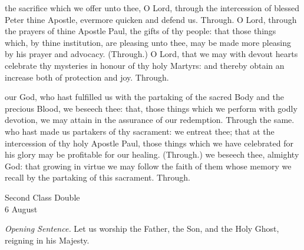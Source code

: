 \secret
{} the sacrifice which we offer unto thee, O Lord, through the intercession of blessed Peter thine Apostle, evermore quicken and defend us. Through.
 O Lord, through the prayers of thine Apostle Paul, the gifts of thy people: that those things which, by thine institution, are pleasing unto thee, may be made more pleasing by his prayer and advocacy. (Through.)
 O Lord, that we may with devout hearts celebrate thy mysteries in honour of thy holy Martyrs: and thereby obtain an increase both of protection and joy. Through.


\postcommunion
{} our God, who hast fulfilled us with the partaking of the sacred Body and the precious Blood, we beseech thee: that, those things which we perform with godly devotion, we may attain in the assurance of our redemption. Through the same.
 who hast made us partakers of thy sacrament: we entreat thee; that at the intercession of thy holy Apostle Paul, those things which we have celebrated for his glory may be profitable for our healing. (Through.)
 we beseech thee, almighty God: that growing in virtue we may follow the faith of them whose memory we recall by the partaking of this sacrament. Through.


\begin{inhead}
    {Second Class Double\\
6 August}
\end{inhead}
\par\noindent
\textit{Opening Sentence.} Let us worship the Father, the Son, and the Holy Ghost, reigning in his Majesty.%



